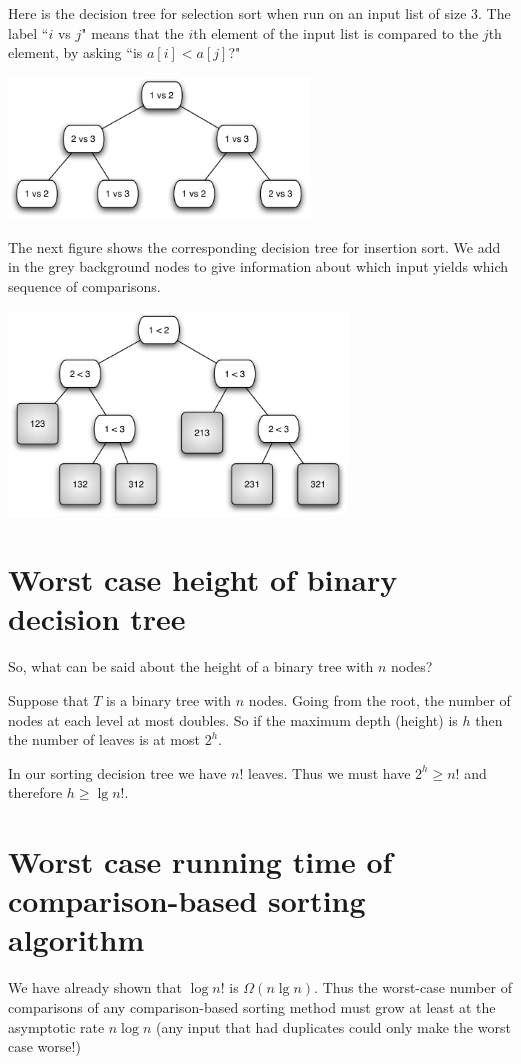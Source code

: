\begin{Boxample}
Here is the decision tree for selection sort when run on an  input list of size $3$. The label 
``$i$ vs $j$" means that the $i$th element of the input list is compared to the $j$th element, by asking
``is $a[i] < a[j]$?"
\begin{center}
\includegraphics[width=8cm]{figs/selsort-dt}
\end{center}

The next figure shows the corresponding decision tree for insertion sort. 
We add in the grey background nodes to give information about 
which input yields which sequence of comparisons.
\begin{center}
\includegraphics[width=9cm]{figs/insort-dt}
\end{center} 
\end{Boxample}

\section{Worst case height of binary decision tree} 
So, what can be said about the height of a binary tree with 
$n$ nodes?

Suppose that $T$ is a binary tree with $n$ nodes. 
Going from the root, the number of nodes at each level at most doubles.
So if the maximum depth (height) is $h$ then the number of leaves is at most $2^h$. 

In our sorting decision tree we have $n!$ leaves. 
Thus we must have $2^h \geq n!$ and therefore $h \geq \lg n!$. 

\section{Worst case running time of comparison-based sorting algorithm}
We have already shown that $\log n!$ is $\Omega (n \lg n)$. Thus the 
worst-case number of comparisons of any comparison-based sorting method must 
grow at least at the asymptotic rate $n \log n$ (any input that had duplicates 
could only make the worst case worse!)

